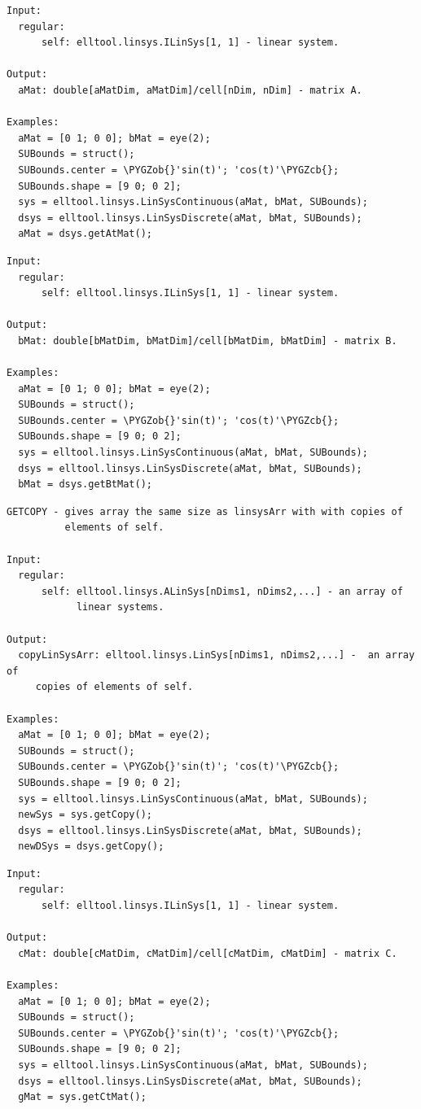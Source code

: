 \documentclass[letterpaper,10pt,english]{sphinxmanual}
\def\PYGZob{\char`\{}
\def\PYGZcb{\char`\}}
\begin{document}
\begin{Verbatim}[commandchars=\\\{\}]
Input:
  regular:
      self: elltool.linsys.ILinSys[1, 1] - linear system.

Output:
  aMat: double[aMatDim, aMatDim]/cell[nDim, nDim] - matrix A.

Examples:
  aMat = [0 1; 0 0]; bMat = eye(2);
  SUBounds = struct();
  SUBounds.center = \PYGZob{}'sin(t)'; 'cos(t)'\PYGZcb{};
  SUBounds.shape = [9 0; 0 2];
  sys = elltool.linsys.LinSysContinuous(aMat, bMat, SUBounds);
  dsys = elltool.linsys.LinSysDiscrete(aMat, bMat, SUBounds);
  aMat = dsys.getAtMat();
\end{Verbatim}

\begin{Verbatim}[commandchars=\\\{\}]
Input:
  regular:
      self: elltool.linsys.ILinSys[1, 1] - linear system.

Output:
  bMat: double[bMatDim, bMatDim]/cell[bMatDim, bMatDim] - matrix B.

Examples:
  aMat = [0 1; 0 0]; bMat = eye(2);
  SUBounds = struct();
  SUBounds.center = \PYGZob{}'sin(t)'; 'cos(t)'\PYGZcb{};
  SUBounds.shape = [9 0; 0 2];
  sys = elltool.linsys.LinSysContinuous(aMat, bMat, SUBounds);
  dsys = elltool.linsys.LinSysDiscrete(aMat, bMat, SUBounds);
  bMat = dsys.getBtMat();
\end{Verbatim}

\begin{Verbatim}[commandchars=\\\{\}]
GETCOPY - gives array the same size as linsysArr with with copies of
          elements of self.

Input:
  regular:
      self: elltool.linsys.ALinSys[nDims1, nDims2,...] - an array of
            linear systems.

Output:
  copyLinSysArr: elltool.linsys.LinSys[nDims1, nDims2,...] -  an array of
     copies of elements of self.

Examples:
  aMat = [0 1; 0 0]; bMat = eye(2);
  SUBounds = struct();
  SUBounds.center = \PYGZob{}'sin(t)'; 'cos(t)'\PYGZcb{};
  SUBounds.shape = [9 0; 0 2];
  sys = elltool.linsys.LinSysContinuous(aMat, bMat, SUBounds);
  newSys = sys.getCopy();
  dsys = elltool.linsys.LinSysDiscrete(aMat, bMat, SUBounds);
  newDSys = dsys.getCopy();
\end{Verbatim}

\begin{Verbatim}[commandchars=\\\{\}]
Input:
  regular:
      self: elltool.linsys.ILinSys[1, 1] - linear system.

Output:
  cMat: double[cMatDim, cMatDim]/cell[cMatDim, cMatDim] - matrix C.

Examples:
  aMat = [0 1; 0 0]; bMat = eye(2);
  SUBounds = struct();
  SUBounds.center = \PYGZob{}'sin(t)'; 'cos(t)'\PYGZcb{};
  SUBounds.shape = [9 0; 0 2];
  sys = elltool.linsys.LinSysContinuous(aMat, bMat, SUBounds);
  dsys = elltool.linsys.LinSysDiscrete(aMat, bMat, SUBounds);
  gMat = sys.getCtMat();
\end{Verbatim}
\end{document}
